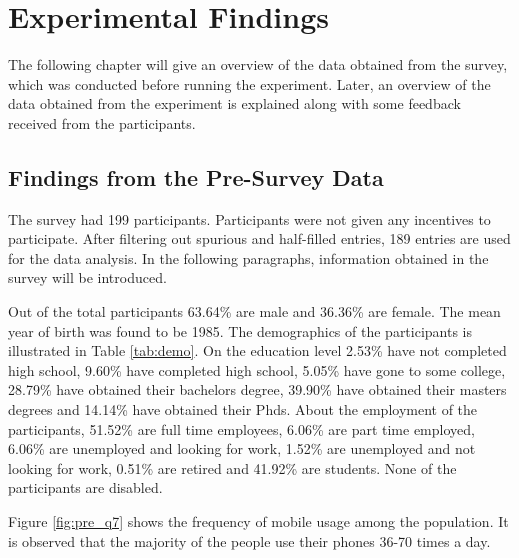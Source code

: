 \chapter{Experimental Findings}
The following chapter will give an overview of the data obtained from the survey, which was conducted before running the experiment.
Later, an overview of the data obtained from the experiment is explained along with some feedback received from the participants.

\section{Findings from the Pre-Survey Data}
The survey had 199 participants. Participants were not given any incentives to participate. After filtering out spurious and half-filled entries, 189 entries are used for the data analysis. In the following paragraphs, information obtained in the survey will be introduced.

Out of the total
participants 63.64\% are male and 36.36\% are female. The mean year of birth was found to be 1985. The demographics of the participants is illustrated in Table \ref{tab:demo}. On the education level 2.53\% have not completed high school, 9.60\% have completed high school, 5.05\% have gone to some college, 28.79\% have obtained their bachelors degree, 39.90\% have obtained their masters degrees and 14.14\% have obtained their Phds. About the employment of the participants, 51.52\% are full time employees, 6.06\% are part time employed, 6.06\% are unemployed and looking for work, 1.52\% are unemployed and not looking for work, 0.51\% are retired and 41.92\% are students. None of the participants are disabled. 


Figure \ref{fig:pre_q7} shows the frequency of mobile usage among the population. It is observed that the majority of the people use their phones 36-70 times a day.

